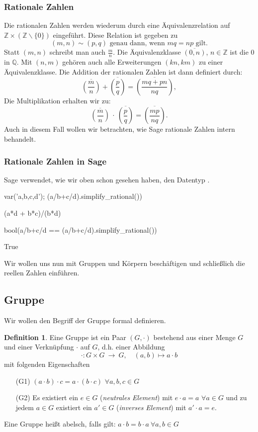 \documentclass[fontsize=12pt,paper=a4,twoside,bibtotoc,idxtotoc,
liststotoc,pagesize,BCOR1.2cm,DIV15,chapterprefix,pagesize=pdftex]{scrbook}
\theoremstyle{plain}
\theoremstyle{definition}
\newtheorem{df}[equation]{Definition}
\theoremstyle{remark}
\begin{document}
\subsubsection{Rationale Zahlen}
Die rationalen Zahlen werden wiederum durch eine Äquivalenzrelation auf $\mathbb{Z}\times(\mathbb{Z}\smallsetminus \{ 0\})$ eingeführt. Diese 
Relation ist gegeben zu
\[ (m,n) \sim (p,q) \mbox{ genau dann, wenn } mq=np \mbox{ gilt.} \]
Statt $(m,n)$ schreibt man auch $\frac{m}{n}$.
Die Äquivalenzklasse $\overline{(0,n)}$, $n \in \mathbb{Z}$ ist
die $0$ in $\mathbb{Q}$.
 Mit $(n,m)$ gehören auch alle Erweiterungen $(kn,km)$ zu einer
Äquivalenzklasse. Die Addition der rationalen Zahlen ist dann definiert durch:  
\[ 
\overline{\genfrac(){}{}{m}{n}}+\overline{\genfrac(){}{}{p}{q}}=\overline{\genfrac(){}{}{mq+pn}{nq}},
\]
Die Multiplikation erhalten wir zu:
\[
\overline{\genfrac(){}{}{m}{n}} \ \cdot \ \overline{\genfrac(){}{}{p}{q}}=\overline{\genfrac(){}{}{mp}{nq}}.
\]
Auch in diesem Fall wollen wir betrachten, wie Sage rationale Zahlen intern behandelt.
\subsubsection{Rationale Zahlen in Sage}
Sage verwendet, wie wir oben schon gesehen haben, den Datentyp . 
\begin{sagein}
var('a,b,c,d'); (a/b+c/d).simplify_rational())
\end{sagein}
\begin{sageout}
(a*d + b*c)/(b*d)
\end{sageout}
\begin{sagein}
bool(a/b+c/d == (a/b+c/d).simplify_rational())
\end{sagein}
\begin{sageout}
True
\end{sageout}
Wir wollen uns nun mit Gruppen und Körpern beschäftigen und schließlich die reellen Zahlen einführen.
\subsection{Gruppe}
Wir wollen den Begriff der Gruppe formal definieren.
\begin{df}
 Eine Gruppe ist ein Paar $(G,\cdot)$ bestehend aus einer Menge $G$ und einer Verknüpfung $\cdot$ auf $G$, d.h. einer Abbildung
\[
 \cdot: G \times G \ \rightarrow \ G, \quad (a,b) \mapsto a \cdot b
\]
mit folgenden Eigenschaften
\begin{itemize}
 \item[(G1)] $(a \cdot b) \cdot c =a \cdot (b \cdot c)$ $\forall a,b,c\in G$
 \item[(G2)] Es existiert ein $e \in G$ ({\it neutrales Element}) mit $e \cdot a =a$ $\forall a
\in G$ und zu jedem $a \in G$ existiert ein $a' \in G$ ({\it inverses
Element}) mit $a' \cdot a=e$. 
\end{itemize}
Eine Gruppe heißt abelsch, falls gilt: $a\cdot b=b\cdot a\ \forall a,b\in G$
\end{df}
\end{document}
